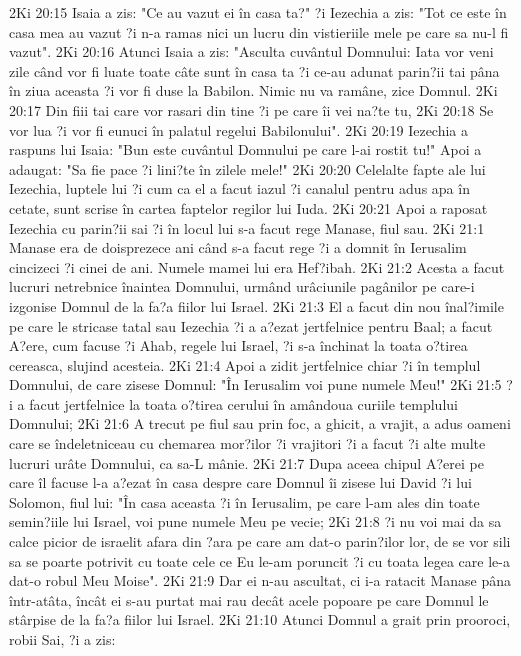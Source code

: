 2Ki 20:15  Isaia a zis: "Ce au vazut ei în casa ta?" ?i Iezechia a zis: "Tot ce este în casa mea au vazut ?i n-a ramas nici un lucru din vistieriile mele pe care sa nu-l fi vazut".
2Ki 20:16  Atunci Isaia a zis: "Asculta cuvântul Domnului: Iata vor veni zile când vor fi luate toate câte sunt în casa ta ?i ce-au adunat parin?ii tai pâna în ziua aceasta ?i vor fi duse la Babilon. Nimic nu va ramâne, zice Domnul.
2Ki 20:17  Din fiii tai care vor rasari din tine ?i pe care îi vei na?te tu,
2Ki 20:18  Se vor lua ?i vor fi eunuci în palatul regelui Babilonului".
2Ki 20:19  Iezechia a raspuns lui Isaia: "Bun este cuvântul Domnului pe care l-ai rostit tu!" Apoi a adaugat: "Sa fie pace ?i lini?te în zilele mele!"
2Ki 20:20  Celelalte fapte ale lui Iezechia, luptele lui ?i cum ca el a facut iazul ?i canalul pentru adus apa în cetate, sunt scrise în cartea faptelor regilor lui Iuda.
2Ki 20:21  Apoi a raposat Iezechia cu parin?ii sai ?i în locul lui s-a facut rege Manase, fiul sau.
2Ki 21:1  Manase era de doisprezece ani când s-a facut rege ?i a domnit în Ierusalim cincizeci ?i cinei de ani. Numele mamei lui era Hef?ibah.
2Ki 21:2  Acesta a facut lucruri netrebnice înaintea Domnului, urmând urâciunile pagânilor pe care-i izgonise Domnul de la fa?a fiilor lui Israel.
2Ki 21:3  El a facut din nou înal?imile pe care le stricase tatal sau Iezechia ?i a a?ezat jertfelnice pentru Baal; a facut A?ere, cum facuse ?i Ahab, regele lui Israel, ?i s-a închinat la toata o?tirea cereasca, slujind acesteia.
2Ki 21:4  Apoi a zidit jertfelnice chiar ?i în templul Domnului, de care zisese Domnul: "În Ierusalim voi pune numele Meu!"
2Ki 21:5  ?i a facut jertfelnice la toata o?tirea cerului în amândoua curiile templului Domnului;
2Ki 21:6  A trecut pe fiul sau prin foc, a ghicit, a vrajit, a adus oameni care se îndeletniceau cu chemarea mor?ilor ?i vrajitori ?i a facut ?i alte multe lucruri urâte Domnului, ca sa-L mânie.
2Ki 21:7  Dupa aceea chipul A?erei pe care îl facuse l-a a?ezat în casa despre care Domnul îi zisese lui David ?i lui Solomon, fiul lui: "În casa aceasta ?i în Ierusalim, pe care l-am ales din toate semin?iile lui Israel, voi pune numele Meu pe vecie;
2Ki 21:8  ?i nu voi mai da sa calce picior de israelit afara din ?ara pe care am dat-o parin?ilor lor, de se vor sili sa se poarte potrivit cu toate cele ce Eu le-am poruncit ?i cu toata legea care le-a dat-o robul Meu Moise".
2Ki 21:9  Dar ei n-au ascultat, ci i-a ratacit Manase pâna într-atâta, încât ei s-au purtat mai rau decât acele popoare pe care Domnul le stârpise de la fa?a fiilor lui Israel.
2Ki 21:10  Atunci Domnul a grait prin prooroci, robii Sai, ?i a zis:
